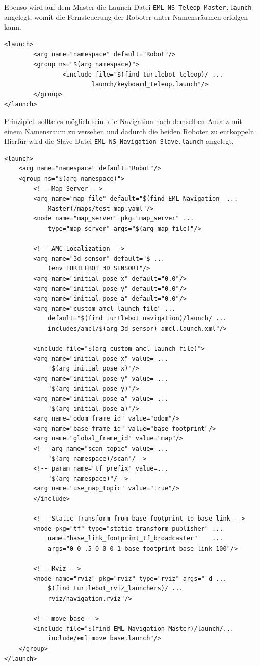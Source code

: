 Ebenso wird auf dem Master die Launch-Datei \lstinline{EML_NS_Teleop_Master.launch}{} angelegt, womit die Fernsteuerung der Roboter unter Namensräumen erfolgen kann.
\begin{lstlisting}[caption={EML\_NS\_Teleop\_Master.launch},captionpos=b]
<launch>
        <arg name="namespace" default="Robot"/>
        <group ns="$(arg namespace)">
                <include file="$(find turtlebot_teleop)/ ...
                		launch/keyboard_teleop.launch"/>
        </group>
</launch>
\end{lstlisting}
Prinzipiell sollte es möglich sein, die Navigation nach demselben Ansatz mit einem Namensraum zu versehen und dadurch die beiden Roboter zu entkoppeln. Hierfür wird die Slave-Datei \lstinline{EML_NS_Navigation_Slave.launch}{} angelegt.
\begin{lstlisting}[caption={EML\_NS\_Navigation\_Slave.launch},captionpos=b]
<launch>
	<arg name="namespace" default="Robot"/>
    <group ns="$(arg namespace)">
    	<!-- Map-Server -->
        <arg name="map_file" default="$(find EML_Navigation_ ...
        	Master)/maps/test_map.yaml"/>
        <node name="map_server" pkg="map_server" ...
        	type="map_server" args="$(arg map_file)"/>

		<!-- AMC-Localization -->
        <arg name="3d_sensor" default="$ ...
        	(env TURTLEBOT_3D_SENSOR)"/>
        <arg name="initial_pose_x" default="0.0"/>
        <arg name="initial_pose_y" default="0.0"/>
        <arg name="initial_pose_a" default="0.0"/>
        <arg name="custom_amcl_launch_file" ...
        	default="$(find turtlebot_navigation)/launch/ ...
        	includes/amcl/$(arg 3d_sensor)_amcl.launch.xml"/>

        <include file="$(arg custom_amcl_launch_file)">
        <arg name="initial_pose_x" value= ...
        	"$(arg initial_pose_x)"/>
        <arg name="initial_pose_y" value= ...
        	"$(arg initial_pose_y)"/>
        <arg name="initial_pose_a" value= ...
        	"$(arg initial_pose_a)"/>
        <arg name="odom_frame_id" value="odom"/>
        <arg name="base_frame_id" value="base_footprint"/>
        <arg name="global_frame_id" value="map"/>
        <!-- arg name="scan_topic" value= ...
        	"$(arg namespace)/scan"/-->
        <!-- param name="tf_prefix" value=...
        	"$(arg namespace)"/-->
        <arg name="use_map_topic" value="true"/>
        </include>

		<!-- Static Transform from base_footprint to base_link -->
        <node pkg="tf" type="static_transform_publisher" ...
        	name="base_link_footprint_tf_broadcaster"    ...
        	args="0 0 .5 0 0 0 1 base_footprint base_link 100"/>

        <!-- Rviz -->
        <node name="rviz" pkg="rviz" type="rviz" args="-d ...
        	$(find turtlebot_rviz_launchers)/ ...
        	rviz/navigation.rviz"/>

        <!-- move_base -->
        <include file="$(find EML_Navigation_Master)/launch/...
        	include/eml_move_base.launch"/>
	</group>
</launch>
\end{lstlisting}
